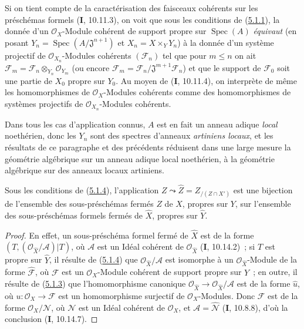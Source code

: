 \begin{scholium}[5.1.7]
\label{III.5.1.7-fr}
Si on tient compte de la caractérisation des faisceaux cohérents sur les préschémas
formels (\textbf{I}, 10.11.3), on voit que sous les conditions de
(\hyperref[III.5.1.1-fr]{5.1.1}), la donnée d'un $\mathcal O_X$-Module cohérent de
support propre sur $\operatorname{Spec}(A)$ \emph{équivaut} (en posant
$Y_n=\operatorname{Spec}(A/\mathfrak J^{n+1})$ et $X_n=X\times_Y Y_n$) à la donnée
d'un système projectif de $\mathcal O_{X_n}$-Modules cohérents $(\mathcal F_n)$ tel
que pour $m\leq n$ on ait
$\mathcal F_m=\mathcal F_n\otimes_{Y_n}\mathcal O_{Y_m}$
(ou encore $\mathcal F_m=\mathcal F_n/\mathfrak J^{m+1}\mathcal F_n$)
et que le support de $\mathcal F_0$ soit une partie de $X_0$ propre sur $Y_0$. Au
moyen de (\textbf{I}, 10.11.4), on interprète de même les homomorphismes de
$\mathcal O_X$-Modules cohérents comme des homomorphismes de systèmes projectifs de
$\mathcal O_{X_n}$-Modules cohérents.


Dans tous les cas d'application connus, $A$ est en fait un anneau adique \emph{local}
noethérien, donc les $Y_n$ sont des spectres d'anneaux \emph{artiniens locaux}, et les
résultats de ce paragraphe et des précédents réduisent dans une large mesure la
géométrie algébrique sur un anneau adique local noethérien, à la géométrie algébrique
sur des anneaux locaux artiniens.
\end{scholium}

\begin{corollary}[5.1.8]
\label{III.5.1.8-fr}
Sous les conditions de \textup{(\hyperref[III.5.1.4-fr]{5.1.4})}, l'application
$Z\leadsto\widehat Z=Z_{/(Z\cap X')}$ est une bijection de l'ensemble des
sous-préschémas fermés $Z$ de $X$, propres sur $Y$, sur l'ensemble des
sous-préschémas formels fermés de $\widehat X$, propres sur $\widehat Y$.
\end{corollary}

\begin{proof}
En effet, un sous-préschéma formel fermé de $\widehat X$ est de la forme
$(T,(\mathcal O_{\widehat X}/\mathcal A)|T)$, où $\mathcal A$ est un Idéal
cohérent de $\mathcal O_{\widehat X}$ (\textbf{I}, 10.14.2)~; si $T$ est propre sur
$\widehat Y$, il résulte de (\hyperref[III.5.1.4-fr]{5.1.4}) que
$\mathcal O_{\widehat X}/\mathcal A$ est isomorphe à un
$\mathcal O_{\widehat X}$-Module de la forme $\widehat{\mathcal F}$, où
$\mathcal F$ est un $\mathcal O_X$-Module cohérent de support propre sur $Y$~; en
outre, il résulte de (\hyperref[III.5.1.3-fr]{5.1.3}) que l'homomorphisme canonique
$\mathcal O_{\widehat X}\to\mathcal O_{\widehat X}/\mathcal A$ est de la forme
$\widehat u$, où $u:\mathcal O_X\to\mathcal F$ est un homomorphisme surjectif de
$\mathcal O_X$-Modules. Donc $\mathcal F$ est de la forme
$\mathcal O_X/\mathcal N$, où $\mathcal N$ est un Idéal cohérent de
$\mathcal O_X$, et $\mathcal A=\widehat{\mathcal N}$ (\textbf{I}, 10.8.8), d'où la
conclusion (\textbf{I}, 10.14.7).
\end{proof}

